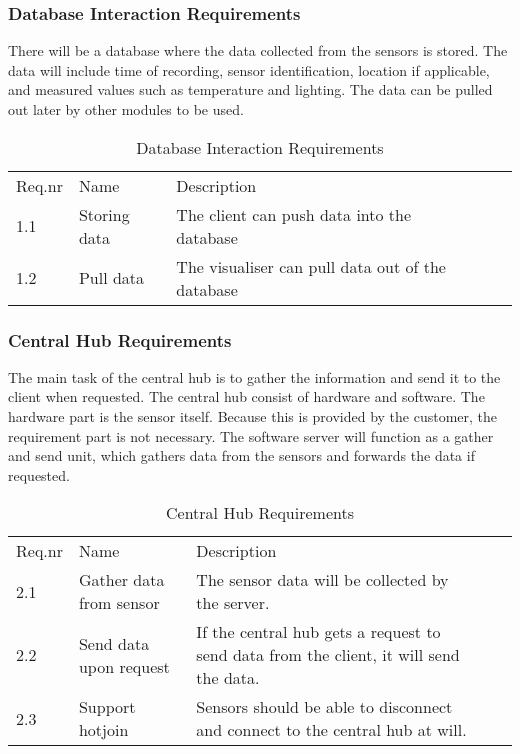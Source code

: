 \documentclass[../document]{subfiles}
\begin{document}
\newpage
\subsubsection{Database Interaction Requirements}
There will be a database where the data collected from the sensors is stored. The data will include time of recording, sensor identification, location if applicable, and measured values such as temperature and lighting. The data can be pulled out later by other modules to be used. 

\begin{table}[H]
\caption{Database Interaction Requirements}
\centering
\begin{tabularx}{\textwidth}{|l|X|X|l|X|}
\hline
\\ \hline Req.nr
&Name
&Description
\\ \hline 1.1
&Storing data
&The client can push data into the database
\\ \hline 1.2
&Pull data
&The visualiser can pull data out of the database
\\ \hline 
\end{tabularx}
\end{table}

\subsubsection{Central Hub Requirements}
The main task of the central hub is to gather the information and send it to the client when requested. The central hub consist of hardware and software. The hardware part is the sensor itself. Because this is provided by the customer, the requirement part is not necessary. The software server will function as a gather and send unit, which gathers data from the sensors and forwards the data if requested.

\begin{table}[H]
\caption{Central Hub Requirements}
\centering
\begin{tabularx}{\textwidth}{|l|X|X|l|X|}
\hline
\\ \hline Req.nr
&Name
&Description
\\ \hline 2.1
&Gather data from sensor
&The sensor data will be collected by the server.
\\ \hline 2.2
&Send data upon request
&If the central hub gets a request to send data from the client, it will send the data.
\\ \hline 2.3
&Support hotjoin
&Sensors should be able to disconnect and connect to the central hub at will.
\\ \hline 
\end{tabularx}
\end{table}
\end{document}
